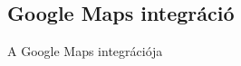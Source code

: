 \subsection*{Google Maps integráció}
\label{googlemaps}
A Google Maps integrációja 































\newpage
